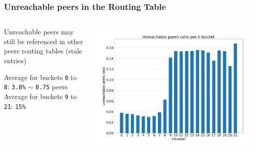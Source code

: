 \documentclass{pl-slide}
\begin{document}
\begin{frame}
\frametitle{Unreachable peers in the Routing Table}

\begin{columns}[onlytextwidth]
\begin{column}{0.38\textwidth}
Unreachable peers may still be referenced in other peers routing tables (stale entries)
\bigskip
   \begin{itemize}
   		\itemc Average for buckets \texttt{0} to \texttt{8}: \texttt{3.8\%} $\sim$ \texttt{0.75} peers
   		\itemc Average for buckets \texttt{9} to \texttt{21}: \texttt{15\%}
   \end{itemize}
\end{column}
\begin{column}{0.58\textwidth}
    \begin{center}
		\includegraphics[width=\textwidth]{plots/unreachable-peers.png}
    \end{center}
\end{column}
\end{columns}
\end{frame}
\end{document}
